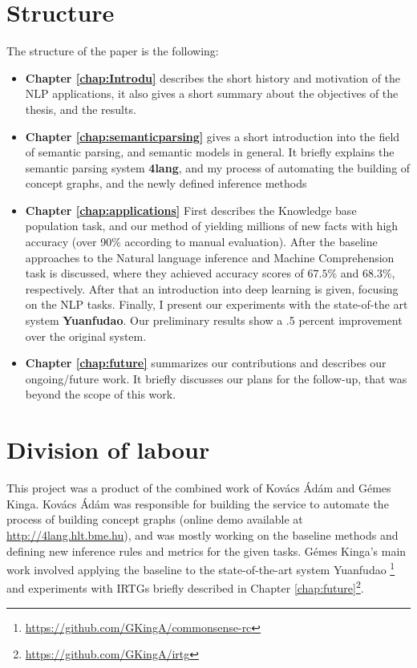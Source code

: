 \section{Structure}
The structure of the paper is the following:
\begin{itemize}
	\item \textbf{Chapter \ref{chap:Introdu}} describes the short history and motivation of the NLP applications, it also gives a short summary about the objectives of the thesis, and the results.
	\item \textbf{Chapter \ref{chap:semanticparsing}} gives a short introduction into the field of semantic parsing, and semantic models in general. It briefly explains the semantic parsing system \textbf{4lang}, and my process of automating the building of concept graphs, and the newly defined inference methods
	\item \textbf{Chapter \ref{chap:applications}} First describes the Knowledge base population task, and our method of yielding millions of new facts with high
	accuracy (over 90\% according to manual evaluation). After the baseline approaches to the Natural language inference and Machine Comprehension task is discussed, where they achieved accuracy scores of $67.5\%$ and $68.3\%$, respectively. After that an introduction into deep learning is given, focusing on the NLP tasks. Finally, I present our experiments with the state-of-the art system \textbf{Yuanfudao}. Our preliminary results show a .5 percent improvement over the original system.
	\item \textbf{Chapter \ref{chap:future}} summarizes our contributions and describes our ongoing/future work. It briefly discusses our plans for the follow-up, that was beyond the scope of this work.
\end{itemize}

\section{Division of labour}
This project was a product of the combined work of Kov\'acs \'Ad\'am and G\'emes Kinga. Kov\'acs \'Ad\'am was responsible for building the service to automate the process of building concept graphs (online demo available at \url{http://4lang.hlt.bme.hu}), and was mostly working on the baseline methods and defining new inference rules and metrics for the given tasks. G\'emes Kinga's main work involved applying the baseline to the state-of-the-art system Yuanfudao \cite{Wang:2018}\footnote{\url{https://github.com/GKingA/commonsense-rc}} and experiments with IRTGs briefly described in Chapter \ref{chap:future}\footnote{\url{https://github.com/GKingA/irtg}}.
